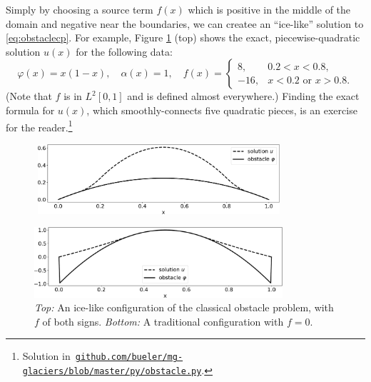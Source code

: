 \documentclass[letterpaper,final,12pt,reqno]{amsart}
\theoremstyle{claim}
\numberwithin{equation}{section}
\numberwithin{figure}{section}
\numberwithin{table}{section}
\numberwithin{theorem}{section}
\begin{document}
Simply by choosing a source term $f(x)$ which is positive in the middle of the domain and negative near the boundaries, we can createe an ``ice-like'' solution to \eqref{eq:obstaclecp}.  For example, Figure \ref{fig:icelike} (top) shows the exact, piecewise-quadratic solution $u(x)$ for the following data:
\begin{equation}
\varphi(x) = x(1-x), \quad \alpha(x)=1, \quad f(x) = \begin{cases} 8, & 0.2 < x < 0.8, \\
                                                                 -16, & x<0.2 \text{ or } x>0.8. \end{cases}  \label{eq:icelikedetails}
\end{equation}
(Note that $f$ is in $L^2[0,1]$ and is defined almost everywhere.)  Finding the exact formula for $u(x)$, which smoothly-connects five quadratic pieces, is an exercise for the reader.\footnote{Solution in\, \href{https://github.com/bueler/mg-glaciers/blob/master/py/obstacle.py}{\texttt{github.com/bueler/mg-glaciers/blob/master/py/obstacle.py}}.}

\begin{figure}
\,\,\includegraphics[width=0.8\textwidth]{fixfigs/icelike.pdf}

\bigskip\medskip
\includegraphics[width=0.82\textwidth]{fixfigs/parabola.pdf}

\medskip
\caption{\emph{Top:} An ice-like configuration of the classical obstacle problem, with $f$ of both signs. \emph{Bottom:} A traditional configuration with $f=0$.}
\label{fig:icelike}
\end{figure}
\end{document}
